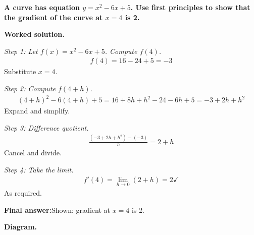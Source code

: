 \documentclass[11pt]{article}
\newcommand{\question}[1]{\par\medskip\noindent\textbf{#1}\par}
\begin{document}
\question{A curve has equation \( y = x^2 - 6x + 5 \). Use first principles to show that the gradient of the curve at \( x = 4 \) is 2.}

\textbf{Worked solution.}

\textit{Step 1: Let \( f(x) = x^2 - 6x + 5 \). Compute \( f(4) \).}
\[\begin{gathered}
f(4) = 16 - 24 + 5 = -3
\end{gathered}\]
Substitute \( x = 4 \).

\textit{Step 2: Compute \( f(4+h) \).}
\[\begin{gathered}
(4+h)^2 - 6(4+h) + 5 = 16 + 8h + h^2 - 24 - 6h + 5 = -3 + 2h + h^2
\end{gathered}\]
Expand and simplify.

\textit{Step 3: Difference quotient.}
\[\begin{gathered}
\frac{(-3 + 2h + h^2) - (-3)}{h} = 2 + h
\end{gathered}\]
Cancel and divide.

\textit{Step 4: Take the limit.}
\[\begin{gathered}
f'(4) = \lim_{h \to 0}(2 + h) = 2 \checkmark
\end{gathered}\]
As required.

\begin{answerbox}
\textbf{Final answer:}\quad Shown: gradient at \(\displaystyle  x = 4 \) is 2.
\end{answerbox}
\textbf{Diagram.}
\end{document}
